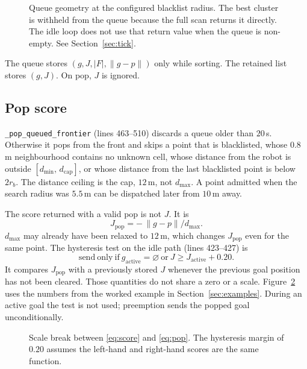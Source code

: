 \documentclass[11pt]{article}
\begin{document}
\begin{figure}[ht]
\centering
\FigQueue
\caption{Queue geometry at the configured blacklist radius. The best cluster is withheld from the queue because the full scan returns it directly. The idle loop does not use that return value when the queue is non-empty. See Section~\ref{sec:tick}.}
\label{fig:queue}
\end{figure}

The queue stores $(g, J, |F|, \|g-p\|)$ only while sorting. The retained list stores $(g, J)$. On pop, $J$ is ignored.

\subsection{Pop score}
\label{sec:pop}
\texttt{\_pop\_queued\_frontier} (lines 463--510) discards a queue older than $20$\,s. Otherwise it pops from the front and skips a point that is blacklisted, whose $0.8$\,m neighbourhood contains no unknown cell, whose distance from the robot is outside $[d_{\min},\,d_{\mathrm{cap}}]$, or whose distance from the last blacklisted point is below $2 r_b$. The distance ceiling is the cap, $12$\,m, not $d_{\max}$. A point admitted when the search radius was $5.5$\,m can be dispatched later from $10$\,m away.

The score returned with a valid pop is not $J$. It is
\begin{equation}
J_{\mathrm{pop}}=-\,\|g-p\|/d_{\max}.
\label{eq:pop}
\end{equation}
$d_{\max}$ may already have been relaxed to $12$\,m, which changes $J_{\mathrm{pop}}$ even for the same point. The hysteresis test on the idle path (lines 423--427) is
\begin{equation}
\mathrm{send\ only\ if\ } g_{\mathrm{active}}=\varnothing \mathrm{\ or\ } J \ge J_{\mathrm{active}}+0.20.
\label{eq:hyst}
\end{equation}
It compares $J_{\mathrm{pop}}$ with a previously stored $J$ whenever the previous goal position has not been cleared. Those quantities do not share a zero or a scale. Figure~\ref{fig:scale} uses the numbers from the worked example in Section~\ref{sec:examples}. During an active goal the test is not used; preemption sends the popped goal unconditionally.

\begin{figure}[ht]
\centering
\FigScaleBug
\caption{Scale break between \eqref{eq:score} and \eqref{eq:pop}. The hysteresis margin of $0.20$ assumes the left-hand and right-hand scores are the same function.}
\label{fig:scale}
\end{figure}
\end{document}
